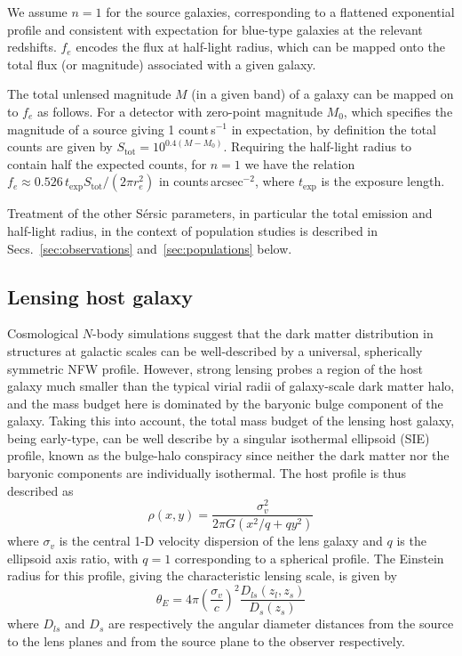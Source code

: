 \documentclass[twocolumn]{aastex62}
\begin{document}
We assume $n=1$ for the source galaxies, corresponding to a flattened exponential profile and consistent with expectation for blue-type galaxies at the relevant redshifts. $f_{e}$ encodes the flux at half-light radius, which can be mapped onto the total flux (or magnitude) associated with a given galaxy.

The total unlensed magnitude $M$ (in a given band) of a galaxy can be mapped on to $f_{e}$ as follows. For a detector with zero-point magnitude $M_0$, which specifies the magnitude of a source giving 1 count\,s$^{-1}$ in expectation, by definition the total counts are given by $S_\mathrm{tot}=10^{0.4(M-M_0)}$. Requiring the half-light radius to contain half the expected counts, for $n=1$ we have the relation $f_{e} \approx 0.526\,t_\mathrm{exp}S_\mathrm{tot} /(2\pi r_e^2)$ in counts\,arcsec$^{-2}$, where $t_\mathrm{exp}$ is the exposure length.

Treatment of the other S\'{e}rsic parameters, in particular the total emission and half-light radius, in the context of population studies is described in Secs.~\ref{sec:observations} and~\ref{sec:populations} below.

\subsection{Lensing host galaxy}

Cosmological $N$-body simulations suggest that the dark matter distribution in structures at galactic scales can be well-described by a universal, spherically symmetric NFW profile. However, strong lensing probes a region of the host galaxy much smaller than the typical virial radii of galaxy-scale dark matter halo, and the mass budget here is dominated by the baryonic bulge component of the galaxy. Taking this into account, the total mass budget of the lensing host galaxy, being early-type, can be well describe by a singular isothermal ellipsoid (SIE) profile, known as the bulge-halo conspiracy since neither the dark matter nor the baryonic components are individually isothermal. The host profile is thus described as
\begin{equation}
\rho(x, y)=\frac{\sigma_{v}^{2}}{2 \pi G\left(x^{2} / q+q y^{2}\right)}
\label{eq:hostprofile}
\end{equation}
where $\sigma_{v}$ is the central 1-D velocity dispersion of the lens galaxy and $q$ is the ellipsoid axis ratio, with $q=1$ corresponding to a spherical profile. The Einstein radius for this profile, giving the characteristic lensing scale, is given by
\begin{equation}
\theta_{{E}}=4 \pi\left(\frac{\sigma_{v}}{c}\right)^{2} \frac{D_{l s}\left(z_{l}, z_{s}\right)}{D_{s}\left(z_{s}\right)}
\label{eq:siethetae}
\end{equation}
where $D_{ls}$ and $D_s$ are respectively the angular diameter distances from the source to the lens planes and from the source plane to the observer respectively.
\end{document}
